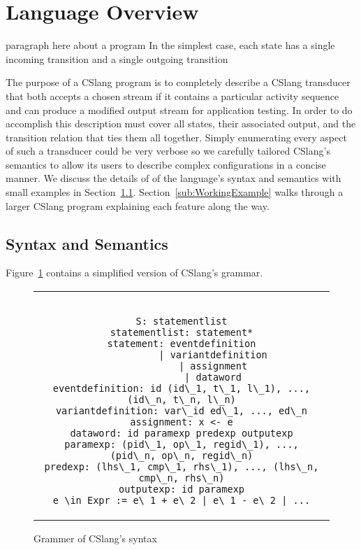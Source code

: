 \section{Language Overview}
\label{sec:Overview}

paragraph here about a program
In the simplest case, each state has a single incoming transition and a
single outgoing transition

The purpose
of a CSlang program is to completely describe a CSlang
transducer that both
accepts a chosen stream if it contains a particular
activity sequence and can produce a modified
output stream
for application testing.
In order to do accomplish this
description must cover all states, their associated output, and the transition
relation that ties them all together.
Simply enumerating every aspect of such a transducer could be very verbose
so we carefully tailored CSlang's semantics to allow its users to
describe complex configurations in a concise manner.
We discuss the details of of the
language's syntax and semantics with small examples in
Section~\ref{sub:SyntaxAndSemantics}.  Section~\ref{sub:WorkingExample} walks through a
larger CSlang program explaining each feature along the way.

\subsection{Syntax and Semantics}
\label{sub:SyntaxAndSemantics}

Figure~\ref{lst:SyntaxGrammar} contains a simplified
version of CSlang's grammar.

\begin{figure}[H]
\centering
\begin{tabular}{c}
\begin{lstlisting}

S: statementlist
statementlist: statement*
statement: eventdefinition
           | variantdefinition
           | assignment
           | dataword
eventdefinition: id (id\_1, t\_1, l\_1), ..., (id\_n, t\_n, l\_n)
variantdefinition: var\_id ed\_1, ..., ed\_n
assignment: x <- e
dataword: id paramexp predexp outputexp
paramexp: (pid\_1, op\_1, regid\_1), ..., (pid\_n, op\_n, regid\_n)
predexp: (lhs\_1, cmp\_1, rhs\_1), ..., (lhs\_n, cmp\_n, rhs\_n)
outputexp: id paramexp
e \in Expr := e\_1 + e\_2 | e\_1 - e\_2 | ...
\end{lstlisting}
\end{tabular}
\caption{Grammer of CSlang's syntax}
\label{lst:SyntaxGrammar}
\end{figure}



